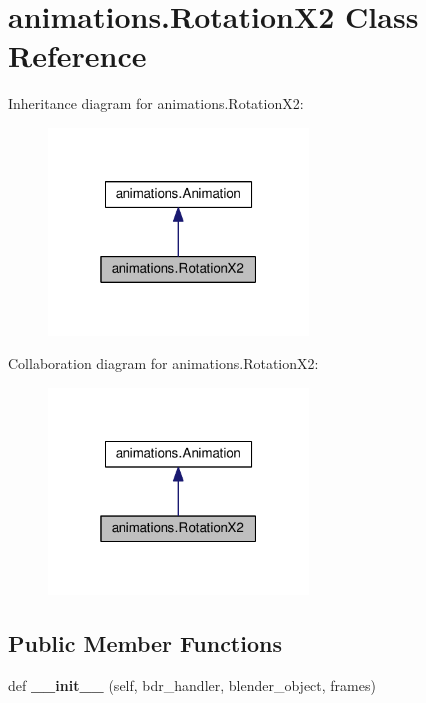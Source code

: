 \hypertarget{classanimations_1_1RotationX2}{}\section{animations.\+Rotation\+X2 Class Reference}
\label{classanimations_1_1RotationX2}


Inheritance diagram for animations.\+Rotation\+X2\+:\nopagebreak
\begin{figure}[H]
\begin{center}
\leavevmode
\includegraphics[width=196pt]{classanimations_1_1RotationX2__inherit__graph}
\end{center}
\end{figure}


Collaboration diagram for animations.\+Rotation\+X2\+:\nopagebreak
\begin{figure}[H]
\begin{center}
\leavevmode
\includegraphics[width=196pt]{classanimations_1_1RotationX2__coll__graph}
\end{center}
\end{figure}
\subsection*{Public Member Functions}
\begin{DoxyCompactItemize}
\item 
def {\bfseries \+\_\+\+\_\+init\+\_\+\+\_\+} (self, bdr\+\_\+handler, blender\+\_\+object, frames)\hypertarget{classanimations_1_1RotationX2_ac9330a17bdf3ad662921c5f44bf77534}{}\label{classanimations_1_1RotationX2_ac9330a17bdf3ad662921c5f44bf77534}

\end{DoxyCompactItemize}
